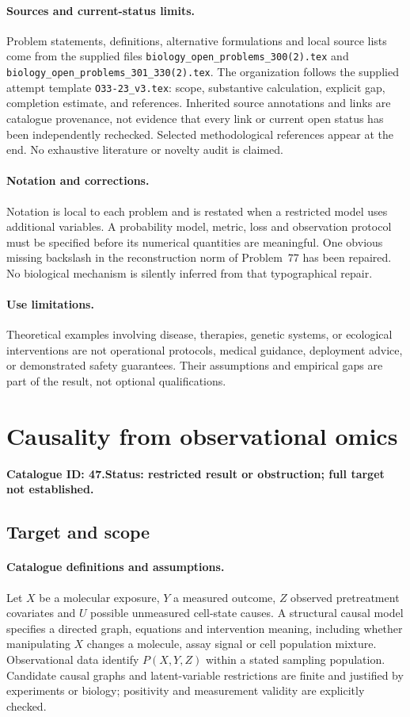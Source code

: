 \documentclass[11pt]{article}
\begin{document}
\paragraph{Sources and current-status limits.}
Problem statements, definitions, alternative formulations and local source lists
come from the supplied files
\texttt{biology\_open\_problems\_300(2).tex} and
\texttt{biology\_open\_problems\_301\_330(2).tex}.
The organization follows the supplied attempt template
\texttt{O33-23\_v3.tex}: scope, substantive calculation, explicit gap,
completion estimate, and references. Inherited source annotations and links are
catalogue provenance, not evidence that every link or current open status has
been independently rechecked. Selected methodological references appear at the
end. No exhaustive literature or novelty audit is claimed.

\paragraph{Notation and corrections.}
Notation is local to each problem and is restated when a restricted model uses
additional variables. A probability model, metric, loss and observation protocol
must be specified before its numerical quantities are meaningful. One obvious
missing backslash in the reconstruction norm of Problem~77 has been repaired.
No biological mechanism is silently inferred from that typographical repair.

\paragraph{Use limitations.}
Theoretical examples involving disease, therapies, genetic systems, or ecological
interventions are not operational protocols, medical guidance, deployment advice,
or demonstrated safety guarantees. Their assumptions and empirical gaps are part
of the result, not optional qualifications.

\setcounter{section}{46}
\section{Causality from observational omics}
\label{prob:047}
\noindent\textbf{Catalogue ID: 47.}\quad \textbf{Status: restricted result or obstruction; full target not established.}
\subsection{Target and scope}
\paragraph{Catalogue definitions and assumptions.}
Let $X$ be a molecular exposure, $Y$ a measured outcome, $Z$ observed pretreatment covariates and $U$ possible unmeasured cell-state causes. A structural causal model specifies a directed graph, equations and intervention meaning, including whether manipulating $X$ changes a molecule, assay signal or cell population mixture. Observational data identify $P(X,Y,Z)$ within a stated sampling population. Candidate causal graphs and latent-variable restrictions are finite and justified by experiments or biology; positivity and measurement validity are explicitly checked.
\end{document}
